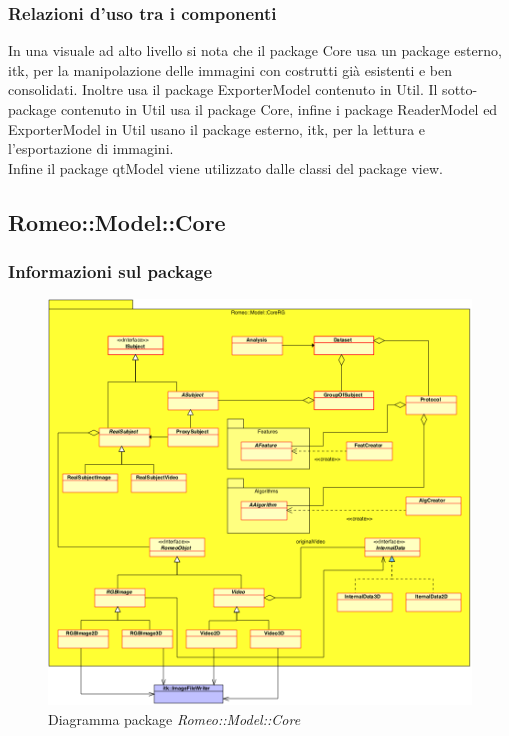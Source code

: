 \subsubsection{Relazioni d'uso tra i componenti}
In una visuale ad alto livello si nota che il package\g{} Core usa un package\g{} esterno, itk, per la manipolazione delle immagini con costrutti già esistenti e ben consolidati. Inoltre usa il package\g{} ExporterModel contenuto in Util. Il sotto-package\g{}  contenuto in Util usa il package\g{} Core, infine i package\g{} ReaderModel ed ExporterModel in Util usano il package\g{} esterno, itk, per la lettura e l'esportazione di immagini.
\\Infine il package\g{} qtModel viene utilizzato dalle classi del package\g{}  view.
\pagebreak	

	\subsection{Romeo::Model::Core}
	\label{romeo::model::core}
		\subsubsection{Informazioni sul package}
		\begin{figure}[!h]
			\centering
			\includegraphics[width=1.1\linewidth]{./Content/Immagini/Romeo__Model__Core.png}
			\caption{Diagramma package \textsl{Romeo::Model::Core}}
		\end{figure}
		
